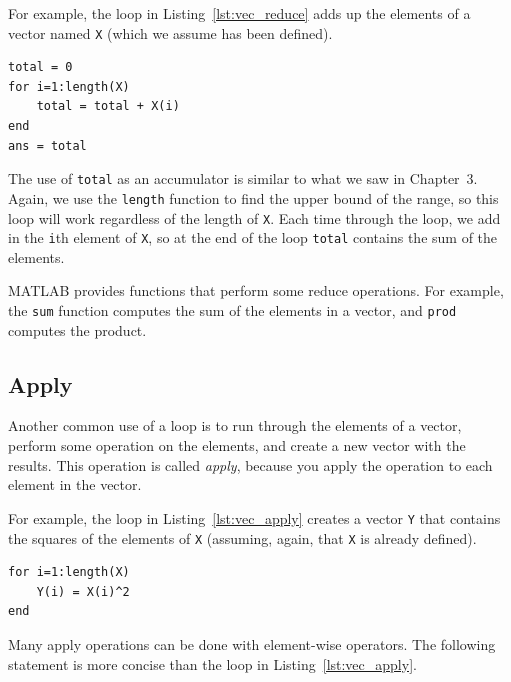 \documentclass[../../book.tex]{subfiles}
\begin{document}

For example, the loop in Listing~\ref{lst:vec_reduce} adds up the elements of a vector named \lstinline{X} (which we assume has been defined).

\begin{lstlisting}[caption={Reducing a vector to a single scalar value (the sum)}, label={lst:vec_reduce}]
total = 0
for i=1:length(X)
    total = total + X(i)
end
ans = total
\end{lstlisting}

The use of \lstinline{total} as an accumulator is similar to what we
saw in Chapter~3.  Again, we use the \lstinline{length} function
to find the upper bound of the range, so this loop will work
regardless of the length of \lstinline{X}.
Each time through the loop, we add
in the \lstinline{i}th element of \lstinline{X}, so at the end of the loop
\lstinline{total} contains the sum of the elements.


MATLAB provides functions that perform some reduce operations.
For example, the \lstinline{sum} function computes the sum of the elements
in a vector, and \lstinline{prod} computes the product.


\subsection{Apply}
\label{apply}

Another common use of a loop is to run through the elements of
a vector, perform some operation on the elements, and create
a new vector with the results.  This operation is called
\emph{apply}, because you apply the operation to each element in
the vector.


For example, the loop in Listing~\ref{lst:vec_apply} creates a vector \lstinline{Y} that
contains the squares of the elements of \lstinline{X} (assuming, again, that \lstinline{X} is already defined).

\begin{lstlisting}[caption={Making a new vector Y by squaring the elements in X}, label={lst:vec_apply}]
for i=1:length(X)
    Y(i) = X(i)^2
end
\end{lstlisting}

Many apply operations can be done with element-wise operators.
The following statement is more concise than the loop in
Listing~\ref{lst:vec_apply}.
\end{document}
